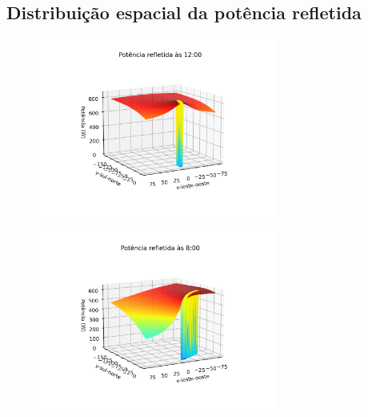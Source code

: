 \documentclass[12pt,notheorems,hyperref={pdfauthor=Professor Rafael Nardi}]{beamer}
\begin{document}
\subsection{Distribuição espacial da potência refletida}

\begin{frame}%
	\begin{figure}[htpb]
		\centering
		\includegraphics[width=0.7\textwidth]{../../plots/tower_shadow_correction/square_grid_12am.png}
		\label{fig:heliost_field_at_12pm}
	\end{figure}
\end{frame}

\begin{frame}%
	\begin{figure}[htpb]
		\centering
		\includegraphics[width=0.7\textwidth]{../../plots/tower_shadow_correction/square_grid_8am.png}
		\label{fig:heliost_field_at_8am}
	\end{figure}
\end{frame}
\end{document}
